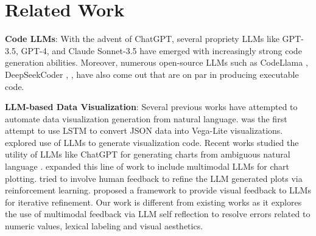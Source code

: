 \section{Related Work}

\noindent\textbf{Code LLMs}: With the advent of ChatGPT, several propriety LLMs like GPT-3.5, GPT-4, and Claude Sonnet-3.5 have emerged with increasingly strong code generation abilities. Moreover, numerous open-source LLMs such as CodeLlama \cite{roziere2023code}, DeepSeekCoder \cite{Guo2024DeepSeekCoderWT}, \cite{Luo2023WizardCoderEC}, \cite{Wei2023MagicoderSC} have also come out that are on par in producing executable code. 


\noindent\textbf{LLM-based Data Visualization}: Several previous works have attempted to automate data visualization generation from natural language. \cite{Dibia2018Data2VisAG} was the first attempt to use LSTM to convert JSON data into Vega-Lite visualizations. \cite{dibia-2023-lida} explored use of LLMs to generate visualization code. Recent works studied the utility of LLMs like ChatGPT for generating charts from ambiguous natural language  \cite{Cheng2023IsGA,tian2024chartgpt}. \cite{berger2024visualization} expanded this line of work to include multimodal LLMs for chart plotting. \cite{xie2024haichart} tried to involve human feedback to refine the LLM generated plots via reinforcement learning. \cite{Yang2024MatPlotAgentMA} proposed a framework to provide visual feedback to LLMs for iterative refinement. Our work is different from existing works as it explores the use of multimodal feedback via LLM self reflection to resolve errors related to numeric values, lexical labeling and visual aesthetics.




